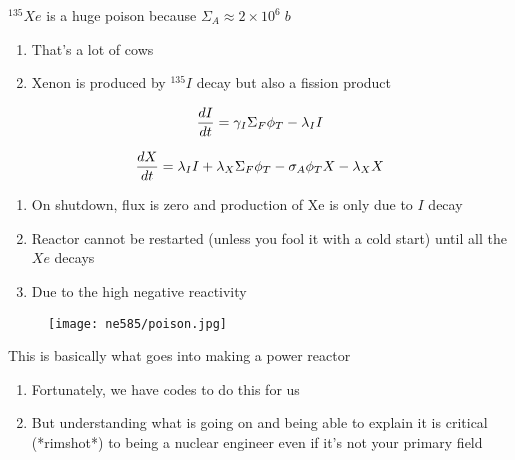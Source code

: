 \documentclass[aspectratio=1610,pdftex,dvipsnames,compress,xcolor={dvipsnames}]{beamer}
\begin{document}
\begin{frame}{$^{135}Xe$ is a huge poison because $\Sigma_A \approx 2 \times 10^6 \; b$}
    \begin{enumerate}[series=outerlist,topsep=0pt,itemsep=21pt,leftmargin=*,label=(\arabic*)]
        \item[]That's a lot of cows
        \item[]Xenon is produced by $^{135}I$ decay but also a fission product
    \end{enumerate}

    \vspace*{\fill}

    \begin{equation}
        \LARGE
        \frac{dI}{dt} = \gamma_I\Sigma_F\phi_T - \lambda_I I
    \end{equation}

    \begin{equation}
        \LARGE
        \frac{dX}{dt} = \lambda_I I + \lambda_X\Sigma_F\phi_T - \sigma_A\phi_T X - \lambda_X X
    \end{equation}

    \vspace*{\fill}

    \begin{enumerate}[series=outerlist,topsep=0pt,itemsep=21pt,leftmargin=*,label=(\arabic*)]
        \item[]On shutdown, flux is zero and production of Xe is only due to $I$ decay
        \item[]Reactor cannot be restarted (unless you fool it with a cold start) until all the $Xe$ decays
        \item[]Due to the high negative reactivity
    \end{enumerate}
\end{frame}


\begin{frame}{}
    \begin{figure}
        \centering
        \texttt{[image: ne585/poison.jpg]}
    \end{figure}
\end{frame}


\begin{frame}{This is basically what goes into making a power reactor}
    \begin{enumerate}[series=outerlist,topsep=0pt,itemsep=21pt,leftmargin=*,label=(\arabic*)]
        \item[]Fortunately, we have codes to do this for us
        \item[]But understanding what is going on and being able to explain it is critical (*rimshot*) to being a nuclear engineer even if it's not your primary field
    \end{enumerate}
\end{frame}
\end{document}

